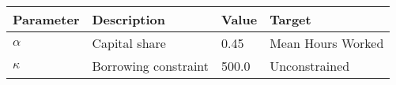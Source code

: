 \begin{tabular}{l l l l} 
\hline 
Parameter & Description & Value & Target \\ 
\hline 
$\alpha$ & Capital share & 0.45 & Mean Hours Worked \\ 
$\kappa$ & Borrowing constraint & 500.0 & Unconstrained \\ 
\hline 
\end{tabular}
